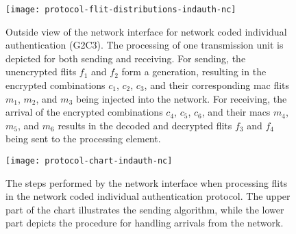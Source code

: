 \begin{figure}
    \centering
    \texttt{[image: protocol-flit-distributions-indauth-nc]}
    \caption[Network coded ind. auth., outside view]{Outside view of the network interface for network coded individual authentication (G2C3). The
    processing of one transmission unit is depicted for both sending and receiving. For sending, the unencrypted flits $f_1$ and $f_2$ form a
    generation, resulting in the encrypted combinations $c_1$, $c_2$, $c_3$, and their corresponding \gls{mac} flits $m_1$, $m_2$, and $m_3$ being
    injected into the network. For receiving, the arrival of the encrypted combinations $c_4$, $c_5$, $c_6$, and their \glspl{mac} $m_4$, $m_5$, and
    $m_6$ results in the decoded and decrypted flits $f_3$ and $f_4$ being sent to the processing element.}
    \label{fig:protflitdistindauthnc}
\end{figure}

\begin{figure}
    \centering
    \texttt{[image: protocol-chart-indauth-nc]}
    \caption[Network coded ind. auth., detailed procedure]{The steps performed by the network interface when processing flits in the network coded
    individual authentication protocol. The upper part of the chart illustrates the sending algorithm, while the lower part depicts the procedure for
    handling arrivals from the network.}
    \label{fig:protchartindauthnc}
\end{figure}

